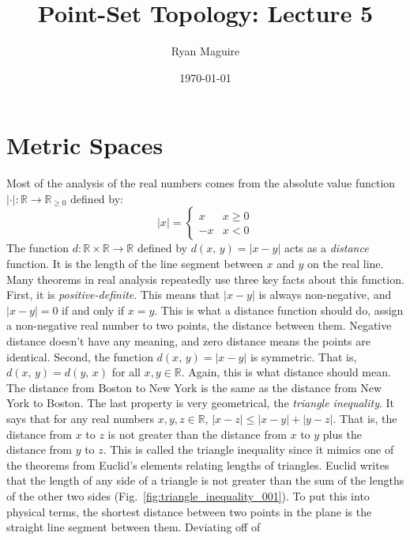 \documentclass{article}
\title{Point-Set Topology: Lecture 5}
\author{Ryan Maguire}
\date{\today}
\theoremstyle{plain}
\theoremstyle{normal}
\begin{document}
    \maketitle
    \section{Metric Spaces}
        Most of the analysis of the real numbers comes from the absolute value
        function $|\cdot|:\mathbb{R}\rightarrow\mathbb{R}_{\geq{0}}$ defined
        by:
        \begin{equation}
            |x|=
            \begin{cases}
                x&x\geq{0}\\
                -x&x<0
            \end{cases}
        \end{equation}
        The function $d:\mathbb{R}\times\mathbb{R}\rightarrow\mathbb{R}$
        defined by $d(x,\,y)=|x-y|$ acts as a \textit{distance} function. It is
        the length of the line segment between $x$ and $y$ on the real line.
        Many theorems in real analysis repeatedly use three key facts about this
        function. First, it is \textit{positive-definite}. This means that
        $|x-y|$ is always non-negative, and $|x-y|=0$ if and only if $x=y$.
        This is what a distance function should do, assign a non-negative
        real number to two points, the distance between them. Negative distance
        doesn't have any meaning, and zero distance means the points are
        identical. Second, the function $d(x,\,y)=|x-y|$ is symmetric. That is,
        $d(x,\,y)=d(y,\,x)$ for all $x,y\in\mathbb{R}$. Again, this is what
        distance should mean. The distance from Boston to New York is the same
        as the distance from New York to Boston. The last property is very
        geometrical, the \textit{triangle inequality}. It says that for any
        real numbers $x,y,z\in\mathbb{R}$, $|x-z|\leq|x-y|+|y-z|$. That is,
        the distance from $x$ to $z$ is not greater than the distance from
        $x$ to $y$ plus the distance from $y$ to $z$. This is called the
        triangle inequality since it mimics one of the theorems from Euclid's
        elements relating lengths of triangles. Euclid writes that the length
        of any side of a triangle is not greater than the sum of the lengths of
        the other two sides (Fig.~\ref{fig:triangle_inequality_001}). To put
        this into physical terms, the shortest distance between two points in
        the plane is the straight line segment between them. Deviating off of
\end{document}
